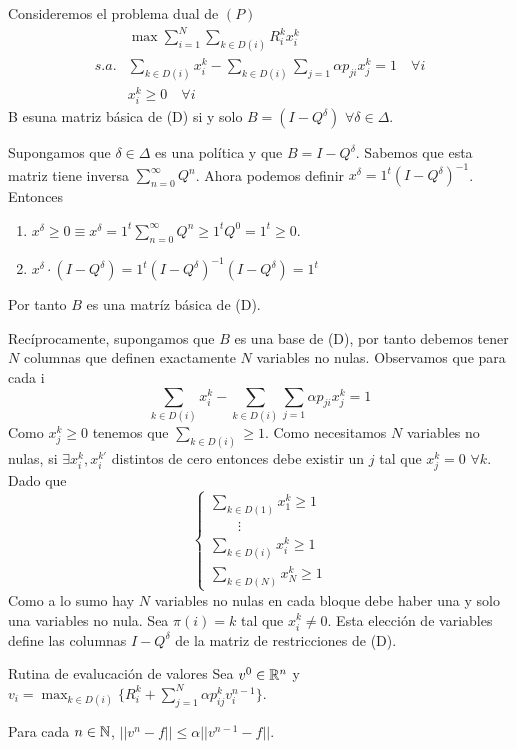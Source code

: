 \documentclass[MIOP.tex]{subfiles}
\begin{document}
\begin{teorema}
Consideremos el problema dual de $(P)$
\begin{align*}
&\max \sum_{i=1}^N\sum_{k\in D(i)}R^k_i x_i^k\\
s.a. & \sum_{k\in D(i)} x_i^k - \sum_{k\in D(i)}\sum_{j=1} \alpha p_{ji} x_j^k = 1 \quad \forall i\\
&x_i^k \geq 0 \quad \forall i
\end{align*}
B esuna matriz básica de (D) si y solo $B=(I-Q^\delta)$ $\forall \delta \in \Delta$.
\end{teorema}
\begin{dem}
Supongamos que $\delta \in \Delta$ es una política y que $B= I-Q^\delta$. Sabemos que esta matriz tiene inversa $\sum_{n=0}^\infty Q^n$. Ahora podemos definir $x^\delta = 1^t(I-Q^\delta)^{-1}$. Entonces
\begin{enumerate}
\item $x^\delta \geq0 \equiv x^\delta = 1^t \sum_{n=0}^\infty Q^n \geq 1^t Q^0 = 1^t \geq 0$.
\item $x^\delta \cdot (I-Q^\delta) = 1^t (I-Q^\delta)^{-1}(I-Q^\delta) = 1^t$
\end{enumerate}
Por tanto $B$ es una matríz básica de (D).

Recíprocamente, supongamos que $B$ es una base de (D), por tanto debemos tener $N$ columnas que definen exactamente $N$ variables no nulas. Observamos que para cada i
$$
\sum_{k\in D(i)}x^k_i - \sum_{k\in D(i)}\sum_{j=1} \alpha p_{ji} x_j^k = 1
$$
Como $x_j^k\geq 0$ tenemos que $\sum_{k\in D(i)} \geq 1$. Como necesitamos $N$ variables no nulas, si $\exists x_i^k, x_i^{k'}$ distintos de cero entonces debe existir un $j$ tal que $x_j^k = 0$ $\forall k$. Dado que
$$
\begin{cases}
\sum_{k\in D(1)} x_1^k \geq 1\\
\qquad\vdots\\
\sum_{k\in D(i)} x_i^k \geq 1\\
\sum_{k\in D(N)} x_N^k \geq 1
\end{cases}
$$
Como a lo sumo hay $N$ variables no nulas en cada bloque debe haber una y solo una variables no nula. Sea $\pi(i)=k$ tal que $x_i^k\neq0$. Esta elección de variables define las columnas $I-Q^\delta$ de la matriz de restricciones de (D). 
\end{dem}
Rutina de evalucación de valores
Sea $v^0\in \mathbb{R}^n$ y $v_i = \max_{k\in D(i)}  \{R_i^k + \sum_{j=1}^N \alpha p_{ij}^k v_i^{n-1}\}$.
\begin{teorema}
Para cada $n\in\mathbb{N}$, $||v^n-f||\leq \alpha||v^{n-1}-f||$.  
\end{teorema}
\end{document}
